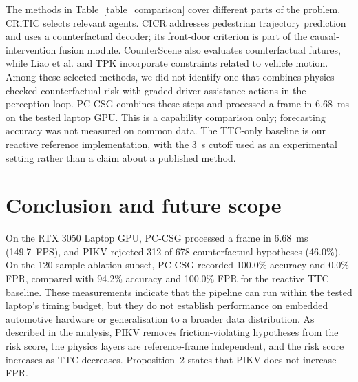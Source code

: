 The methods in Table~\ref{table_comparison} cover different parts of the problem. CRiTIC \cite{ahmadi2025critic} selects relevant agents. CICR \cite{han2025cicr} addresses pedestrian trajectory prediction and uses a counterfactual decoder; its front-door criterion is part of the causal-intervention fusion module. CounterScene \cite{jing2026counterscene} also evaluates counterfactual futures, while Liao et al. \cite{liao2024physics} and TPK \cite{baden2025tpk} incorporate constraints related to vehicle motion. Among these selected methods, we did not identify one that combines physics-checked counterfactual risk with graded driver-assistance actions in the perception loop. PC-CSG combines these steps and processed a frame in 6.68~ms on the tested laptop GPU. This is a capability comparison only; forecasting accuracy was not measured on common data. The TTC-only baseline is our reactive reference implementation, with the 3~s cutoff used as an experimental setting rather than a claim about a published method.

\section{Conclusion and future scope} \label{section5}
On the RTX 3050 Laptop GPU, PC-CSG processed a frame in 6.68~ms (149.7~FPS), and PIKV rejected 312 of 678 counterfactual hypotheses (46.0\%). On the 120-sample ablation subset, PC-CSG recorded 100.0\% accuracy and 0.0\% FPR, compared with 94.2\% accuracy and 100.0\% FPR for the reactive TTC baseline. These measurements indicate that the pipeline can run within the tested laptop's timing budget, but they do not establish performance on embedded automotive hardware or generalisation to a broader data distribution. As described in the analysis, PIKV removes friction-violating hypotheses from the risk score, the physics layers are reference-frame independent, and the risk score increases as TTC decreases. Proposition~2 states that PIKV does not increase FPR.


